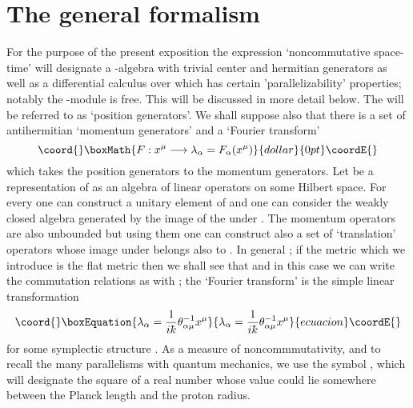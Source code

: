 \documentclass[12pt,a4paper]{article}
\newcounter{eg}
\def\b#1{{\mathbb #1}}
\def\c#1{{\cal #1}}
\def\kbar{{\mathchar'26\mkern-9muk}}
\providecommand{\initiate}{\setcounter{equation}{0}}
\begin{document}
\initiate
\section{The general formalism}

For the purpose of the present exposition the expression
`noncommutative space-time' will designate a \myHighlight{$*$}\coordHE{}-algebra \myHighlight{$\c{A}$}\coordHE{} with
trivial center and \coordHE{} hermitian generators \coordHE{} as well as a
differential calculus \myHighlight{$\Omega^*(\c{A})$}\coordHE{} over \myHighlight{$\c{A}$}\coordHE{} which has certain
'parallelizability' properties; notably the \myHighlight{$\c{A}$}\coordHE{}-module
\myHighlight{$\Omega^1(\c{A})$}\coordHE{} is free. This will be discussed in more detail
below. The \coordHE{} will be referred to as `position generators'.  We
shall suppose also that there is a set of \coordHE{} antihermitian
`momentum generators' \myHighlight{$\lambda_\alpha$}\coordHE{} and a `Fourier transform'
$$\coord{}\boxMath{
F: x^\mu \longrightarrow \lambda_\alpha = F_\alpha (x^\mu)
}{dollar}{0pt}\coordE{}$$
which takes the position generators to the momentum generators.
Let \myHighlight{$\rho$}\coordHE{} be a representation of \myHighlight{$\c{A}$}\coordHE{} as an algebra of linear
operators on some Hilbert space.  For every \myHighlight{$k_\mu \in \b{R}^4$}\coordHE{} one
can construct a unitary element \coordHE{} of \myHighlight{$\c{A}$}\coordHE{} 
and one can consider the weakly closed algebra \myHighlight{$\c{A}_\rho$}\coordHE{} generated
by the image of the \coordHE{} under \myHighlight{$\rho$}\coordHE{}.  The momentum operators
\myHighlight{$\lambda_\alpha$}\coordHE{} are also unbounded but using them one can construct
also a set of `translation' operators 
\coordHE{} whose image under \myHighlight{$\rho$}\coordHE{}
belongs also to \myHighlight{$\c{A}_\rho$}\coordHE{}. In general \coordHE{}; if
the metric which we introduce is the flat metric then we shall see
that \coordHE{} and in this case we
can write the commutation relations as \coordHE{} with 
\coordHE{};  the `Fourier transform' is the simple linear
transformation
\begin{equation}\coord{}\boxEquation{
\lambda_\alpha  = \frac{1}{i\kbar}\theta^{-1}_{\alpha\mu} x^\mu   \label{bc}
}{
\lambda_\alpha  = \frac{1}{i\kbar}\theta^{-1}_{\alpha\mu} x^\mu   }{ecuacion}\coordE{}\end{equation}
for some symplectic structure \myHighlight{$\theta^{\alpha\mu}$}\coordHE{}. As a measure of
noncommmutativity, and to recall the many parallelisms with quantum
mechanics, we use the symbol \myHighlight{$\kbar$}\coordHE{}, which will designate the square
of a real number whose value could lie somewhere between the Planck
length and the proton radius. 
\end{document}
